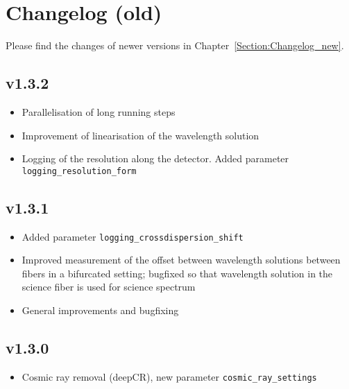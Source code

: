 \documentclass[10pt,a4paper]{article}
\begin{document}


\newpage

\appendix

\section{Changelog (old)}
\label{Section:Changelog_old}
Please find the changes of newer versions in Chapter~\ref{Section:Changelog_new}.

\subsection*{v1.3.2}
\begin{itemize}\setlength\itemsep{0em}
  \item Parallelisation of long running steps
  \item Improvement of linearisation of the wavelength solution
  \item Logging of the resolution along the detector. Added parameter \verb|logging_resolution_form|
\end{itemize}

\subsection*{v1.3.1}
\begin{itemize}\setlength\itemsep{0em}
  \item Added parameter \verb|logging_crossdispersion_shift|
  \item Improved measurement of the offset between wavelength solutions between fibers in a bifurcated setting; bugfixed so that wavelength solution in the science fiber is used for science spectrum
  \item General improvements and bugfixing
\end{itemize}

\subsection*{v1.3.0}
\begin{itemize}\setlength\itemsep{0em}
  \item Cosmic ray removal (deepCR), new parameter \verb|cosmic_ray_settings|
\end{itemize}
\end{document}
